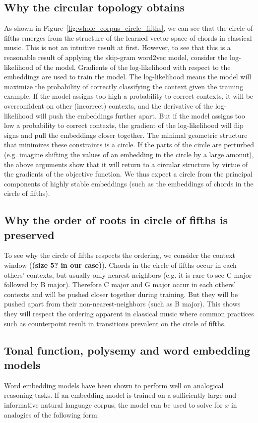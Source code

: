 
\subsection{Why the circular topology obtains}
As shown in Figure~\ref{fig:whole_corpus_circle_fifths}, we can see that the circle of fifths emerges from the structure of the learned vector space of chords in classical music.
This is not an intuitive result at first.
However, to see that this is a reasonable result of applying the skip-gram word2vec model, consider the log-likelihood of the model.
Gradients of the log-likelihood with respect to the embeddings are used to train the model.
The log-likelihood means the model will maximize the probability of correctly classifying the context given the training example.
If the model assigns too high a probability to correct contexts, it will be overconfident on other (incorrect) contexts, and the derivative of the log-likelihood will push the embeddings further apart.
But if the model assigns too low a probability to correct contexts, the gradient of the log-likelihood will flip signs and pull the embeddings closer together.
The minimal geometric structure that minimizes these constraints is a circle. If the parts of the circle are perturbed (e.g. imagine shifting the values of an embedding in the circle by a large amonut), the above arguments show that it will return to a circular structure by virtue of the gradients of the objective function.
We thus expect a circle from the principal components of highly stable embeddings (such as the embeddings of chords in the circle of fifths).
\subsection{Why the order of roots in circle of fifths is preserved}
To see why the circle of fifths respects the ordering, we consider the context window (\textbf{(size 5? in our case)}).
Chords in the circle of fifths occur in each others' contexts, but usually only nearest neighbors (e.g. it is rare to see C major followed by B major).
Therefore C major and G major occur in each others' contexts and will be pushed closer together during training.
But they will be pushed apart from their non-nearest-neighbors (such as B major). This shows they will respect the ordering apparent in classical music where common practices such as counterpoint result in transitions prevalent on the circle of fifths.

\subsection{Tonal function, polysemy and word embedding models}
Word embedding models have been shown to perform well on analogical reasoning tasks. If an embedding model is trained on a sufficiently large and informative natural language corpus, the model can be used to solve for $x$ in analogies of the following form:


